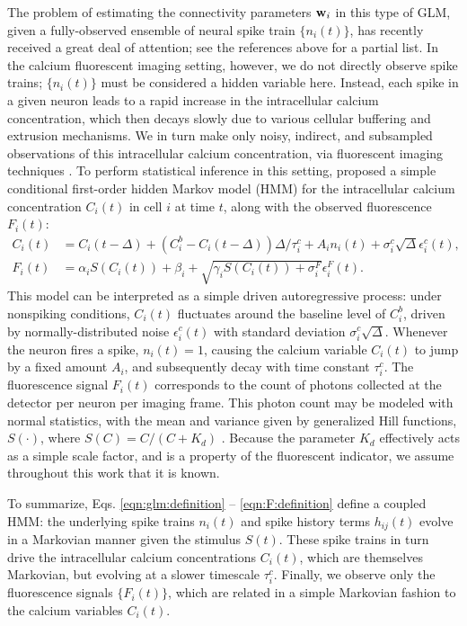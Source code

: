 The problem of estimating the connectivity parameters $\mathbf{w}_i$ in this
type of GLM, given a fully-observed ensemble of neural spike train
$\{n_i(t)\}$, has recently received a great deal of attention; see the
references above for a partial list. In the calcium fluorescent
imaging setting, however, we do not directly observe spike trains;
$\{n_i(t)\}$ must be considered a hidden variable here. Instead, each
spike in a given neuron leads to a rapid increase in the intracellular
calcium concentration, which then decays slowly due to various
cellular buffering and extrusion mechanisms. We in turn make only
noisy, indirect, and subsampled observations of this intracellular
calcium concentration, via fluorescent imaging techniques
\cite{ImagingManual}. To perform statistical inference in this
setting, \cite{Vogelstein2009} proposed a simple conditional
first-order hidden Markov model (HMM) for the intracellular calcium
concentration $C_i(t)$ in cell $i$ at time $t$, along with the
observed fluorescence $F_i(t)$:
\begin{align} 
\label{eqn:ca:definition} 
C_i(t) &= C_i(t-\Delta) + (C_i^b-C_i(t-\Delta)) \Delta/\tau^c_i + A_i
n_i(t)+\sigma^c_i \sqrt{\Delta} \epsilon^c_i(t), \\ F_i(t) &= \alpha_i
S(C_i(t)) + \beta_i + \sqrt{\gamma_i S(C_i(t)) + \sigma^F_i}
\epsilon^F_i(t). \label{eqn:F:definition}
\end{align} 
This model can be interpreted as a simple driven autoregressive
process: under nonspiking conditions, $C_i(t)$ fluctuates around the
baseline level of $C_i^b$, driven by normally-distributed noise
$\epsilon^c_i(t)$ with standard deviation $\sigma^c_i
\sqrt{\Delta}$. Whenever the neuron fires a spike, $n_i(t)=1$, causing
the calcium variable $C_i(t)$ to jump by a fixed amount $A_i$, and
subsequently decay with time constant $\tau^c_i$. The fluorescence
signal $F_i(t)$ corresponds to the count of photons collected at the
detector per neuron per imaging frame. This photon count may be
modeled with normal statistics, with the mean and variance given by
generalized Hill functions, $S(\cdot)$, where $S(C)=C/(C+K_d)$
\cite{Yasuda2004}. Because the parameter $K_d$ effectively acts as a
simple scale factor, and is a property of the fluorescent indicator,
we assume throughout this work that it is known.

To summarize, Eqs. \ref{eqn:glm:definition} -- \ref{eqn:F:definition}
define a coupled HMM: the underlying spike trains $n_i(t)$ and spike
history terms $h_{ij}(t)$ evolve in a Markovian manner given the
stimulus $S(t)$.  These spike trains in turn drive the intracellular
calcium concentrations $C_i(t)$, which are themselves Markovian, but
evolving at a slower timescale $\tau_i^c$.  Finally, we observe only
the fluorescence signals $\{F_i(t)\}$, which are related in a simple
Markovian fashion to the calcium variables $C_i(t)$.



